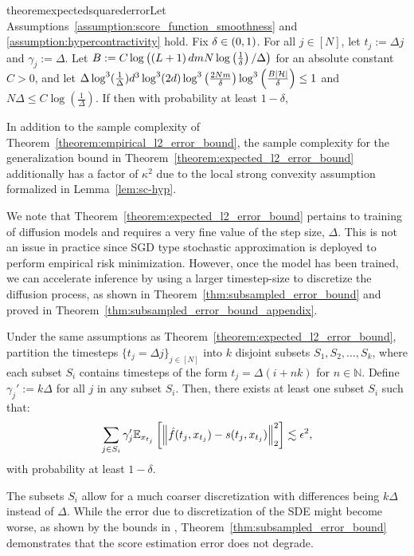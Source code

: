 \begin{restatable}{theorem}{expectedsquarederror}\label{theorem:expected_l2_error_bound}Let Assumptions~\ref{assumption:score_function_smoothness} and \ref{assumption:hypercontractivity} hold. Fix $\delta \in \left(0,1\right)$. For all $j \in [N]$, let $t_{j} := \Delta j$ and $\gamma_{j} := \Delta$. Let $B := C\log\left(\left(L+1\right)dmN\log\left(\frac{1}{\delta}\right)/\Delta\right)$ for an absolute constant $C > 0$, and let $\Delta\log^3(\tfrac{1}{\Delta})d^{3}\log^3(2d)\log^3\left(\frac{2Nm}{\delta}\right)\log^3\left(\frac{B|\mathcal{H}|}{\delta}\right) \leq 1$ and $N\Delta \leq C\log(\frac{1}{\Delta})$. If
then with probability at least $1-\delta$, 
\end{restatable}

\begin{remark}
     In addition to the sample complexity of Theorem~\ref{theorem:empirical_l2_error_bound}, the sample complexity for the generalization bound in Theorem~\ref{theorem:expected_l2_error_bound} additionally has a factor of $\kappa^{2}$ due to the local strong convexity assumption formalized in Lemma~\ref{lem:sc-hyp}. 
\end{remark}

We note that Theorem~\ref{theorem:expected_l2_error_bound} pertains to training of diffusion models and requires a very fine value of the step size, $\Delta$. This is not an issue in practice since SGD type stochastic approximation is deployed to perform empirical risk minimization. However, once the model has been trained, we can accelerate inference by using a larger timestep-size to discretize the diffusion process, as shown in Theorem~\ref{thm:subsampled_error_bound} and proved in Theorem~\ref{thm:subsampled_error_bound_appendix}.

\begin{theorem}\label{thm:subsampled_error_bound} Under the same assumptions as Theorem~\ref{theorem:expected_l2_error_bound}, partition the timesteps $\{t_j = \Delta j\}_{j \in [N]}$ into $k$ disjoint subsets $S_1, S_2, \dots, S_k$, where each subset $S_i$ contains timesteps of the form $t_j = \Delta(i + nk)$ for $n \in \mathbb{N}$. Define $\gamma_j' := k\Delta$ for all $j$ in any subset $S_i$. Then, there exists at least one subset $S_i$ such that:
\[
\sum_{j \in S_i} \gamma_j' \mathbb{E}_{x_{t_j}}\left[\left\lVert\hat{f}(t_j, x_{t_j}) - s(t_j, x_{t_j})\right\rVert_2^2\right] \lesssim \epsilon^2,
\]
with probability at least $1 - \delta$.
\end{theorem}
The subsets $S_i$ allow for a much coarser discretization with differences being $k\Delta$ instead of $\Delta$. While the error due to discretization of the SDE might become worse, as shown by the bounds in \cite{benton2024nearly}, Theorem~\ref{thm:subsampled_error_bound} demonstrates that the score estimation error does not degrade.

